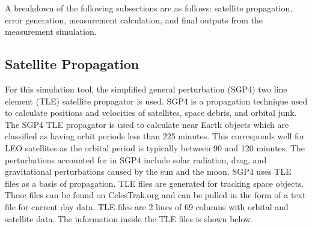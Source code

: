 \documentclass[12pt]{report}
\begin{document}
A breakdown of the following subsections are as follows: satellite propagation, error generation, measurement calculation, and final outputs from the measurement simulation. 

\subsection{Satellite Propagation}
For this simulation tool, the simplified general perturbation (SGP4) two line element (TLE) satellite propagator is used. SGP4 is a propagation technique used to calculate positions and velocities of satellites, space debris, and orbital junk. The SGP4 TLE propagator is used to calculate near Earth objects which are classified as having orbit periods less than 225 minutes. This corresponds well for LEO satellites as the orbital period is typically between 90 and 120 minutes. The perturbations accounted for in SGP4 include solar radiation, drag, and gravitational perturbations caused by the sun and the moon. SGP4 uses TLE files as a basis of propagation. TLE files are generated for tracking space objects. These files can be found on CelesTrak.org and can be pulled in the form of a text file for current day data. TLE files are 2 lines of 69 columns with orbital and satellite data. The information inside the TLE files is shown below.
\end{document}
